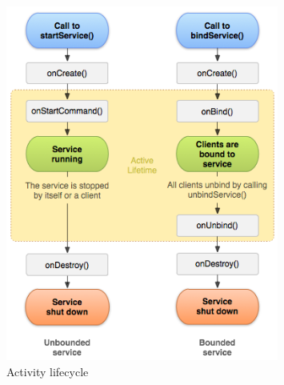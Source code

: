 \begin{figure}[H]
\centering
\includegraphics[width=0.8\textwidth]{Figures/service_lifecycle.png}
\caption{Activity lifecycle}
\label{android-service}
\end{figure}
